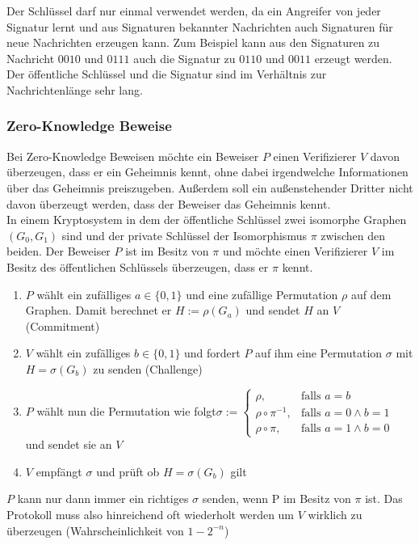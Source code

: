 \documentclass[a4paper,12pt,leqno]{article}
\begin{document}
Der Schlüssel darf nur einmal verwendet werden, da ein Angreifer von jeder Signatur lernt und aus Signaturen bekannter Nachrichten auch Signaturen für neue Nachrichten erzeugen kann. Zum Beispiel kann aus den Signaturen zu Nachricht $0010$ und $0111$ auch die Signatur zu $0110$ und $0011$ erzeugt werden.\\
Der öffentliche Schlüssel und die Signatur sind im Verhältnis zur Nachrichtenlänge sehr lang.

\subsubsection{Zero-Knowledge Beweise}

Bei Zero-Knowledge Beweisen möchte ein Beweiser $P$ einen Verifizierer $V$ davon überzeugen, dass er ein Geheimnis kennt, ohne dabei irgendwelche Informationen über das Geheimnis preiszugeben. Außerdem soll ein außenstehender Dritter nicht davon überzeugt werden, dass der Beweiser das Geheimnis kennt.\\

In einem Kryptosystem in dem der öffentliche Schlüssel zwei isomorphe Graphen $(G_0,G_1)$ sind und der private Schlüssel der Isomorphismus $\pi$ zwischen den beiden. Der Beweiser $P$ ist im Besitz von $\pi$ und möchte einen Verifizierer $V$ im Besitz des öffentlichen Schlüssels überzeugen, dass er $\pi$ kennt.

\begin{enumerate}
\item $P$ wählt ein zufälliges $a\in\{0,1\}$ und eine zufällige Permutation $\rho$ auf dem Graphen. Damit berechnet er $H:=\rho(G_a)$ und sendet $H$ an $V$ (Commitment)
\item $V$ wählt ein zufälliges $b\in\{0,1\}$ und fordert $P$ auf ihm eine Permutation $\sigma$ mit $H=\sigma(G_b)$ zu senden (Challenge)
\item $P$ wählt nun die Permutation wie folgt$\sigma:=\left\lbrace\begin{array}{lr}
\rho, & \textrm{falls }a=b\\
\rho\circ \pi^{-1},& \textrm{falls }a=0\wedge b=1\\
\rho\circ \pi, &\textrm{falls }a=1\wedge b=0
\end{array}\right.$ und sendet sie an $V$
\item $V$ empfängt $\sigma$ und prüft ob $H=\sigma(G_b)$ gilt
\end{enumerate}
$P$ kann nur dann immer ein richtiges $\sigma$ senden, wenn P im Besitz von $\pi$ ist. Das Protokoll muss also hinreichend oft wiederholt werden um $V$ wirklich zu überzeugen (Wahrscheinlichkeit von $1-2^{-n}$)
\end{document}
